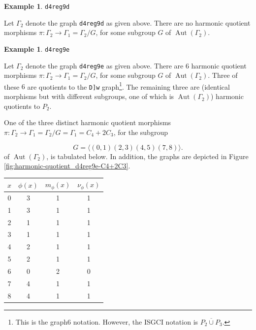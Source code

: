 \documentclass[12pt,letterpaper]{article}
\theoremstyle{definition}
\newtheorem{example}[theorem]{Example}
\DeclareMathOperator{\Aut}{Aut}
\begin{document}
\begin{example}%
\label{example:d4reg9d}
 {\tt d4reg9d}\newline
{\rm  
  Let $\Gamma_2$ denote the graph {\tt d4reg9d} as given above.
There are no harmonic quotient morphisms
$\pi: \Gamma_2\to \Gamma_1=\Gamma_2/G$,
for some subgroup $G$ of $\Aut(\Gamma_2)$.

}
\end{example}




\begin{example}%
\label{example:d4reg9e}
 {\tt d4reg9e}\newline
{\rm  
Let $\Gamma_2$ denote the graph {\tt d4reg9e} as given above.
There are $6$ harmonic quotient morphisms
$\pi: \Gamma_2\to \Gamma_1=\Gamma_2/G$,
for some subgroup $G$ of $\Aut(\Gamma_2)$.
Three of these $6$ are quotients to the \verb+D]w+
graph\footnote{This is the graph6 notation. However, the ISGCI notation is
$\overline{P_2\cup P_3}$.}. The remaining three are
(identical morphisms but with different subgroups, one of which is $\Aut(\Gamma_2)$)
harmonic quotients to $P_2$.

One of the three distinct harmonic quotient morphisms
$\pi: \Gamma_2\to \Gamma_1=\Gamma_2/G=\Gamma_1=C_4+2C_3$,
for the subgroup

\[
G = \langle (0,1)(2,3)(4,5)(7,8) \rangle.
\]
of $\Aut(\Gamma_2)$, is tabulated below.
In addition, the graphs are depicted
in Figure \ref{fig:harmonic-quotient_d4reg9e-C4+2C3}.

\begin{center}
\begin{tabular}{c|c|c|c}  
  $x$ & $\phi(x)$ & $m_\phi(x)$ & $\nu_\phi(x)$ \\ \hline
  0   &    3   &        1         &  1   \\ 
  1   &    3   &        1         &  1  \\ 
  2   &    1   &        1         &  1  \\ 
  3   &    1   &        1         &  1  \\ 
  4   &    2   &        1         &  1   \\
  5   &    2   &        1         &  1   \\
  6   &    0   &        2         &  0   \\
  7   &    4   &        1         &  1   \\
  8   &    4   &        1         &  1   \\ 
\end{tabular}
\end{center}

}
\end{example}
\end{document}
